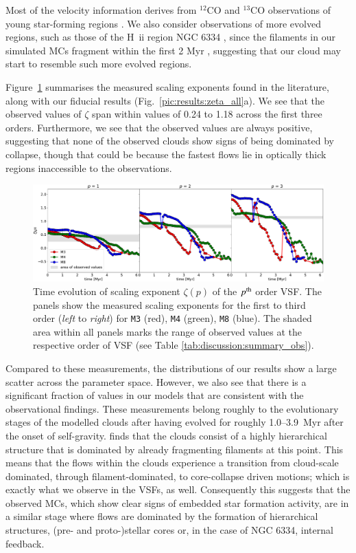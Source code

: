 \documentclass{aa}		%
\begin{document}
Most of the velocity information derives from $^{12}$CO and $^{13}$CO observations of young star-forming regions \citep[e.g. Perseus and Taurus][]{Padoan2003}.
We also consider observations of more evolved regions, such as those of the H~{\sc ii} region NGC 6334 \citep{Zernickel2015}, since the filaments in our simulated MCs fragment within the first 2 Myr , suggesting that our cloud may start to resemble such more evolved regions.

Figure~\ref{pic:discussion:comp_observation} summarises the measured scaling exponents found in the literature, along with our fiducial results (Fig.~\ref{pic:results:zeta_all}a).
We see that the observed values of $\zeta$ span within values of 0.24 to 1.18 across the first three orders. 
Furthermore, we see that the observed values are always positive, suggesting that none of the observed clouds show signs of being dominated by collapse, though that could be because the fastest flows lie in optically thick regions inaccessible to the observations.  

\begin{figure}
	\includegraphics[width=\textwidth]{compare_observations.pdf}
	\caption{
	Time evolution of scaling exponent $\zeta(p)$ of the $p^{\rm th}$ order VSF. 
	The panels show the measured scaling exponents for the first to third order (\textit{left} to \textit{right}) for \texttt{M3} (red), \texttt{M4} (green), \texttt{M8} (blue). 
	The shaded area within all panels marks the range of observed values at the respective order of VSF (see Table \ref{tab:discussion:summary_obs}).
	}
	\label{pic:discussion:comp_observation}
\end{figure}


Compared to these measurements, the distributions of our results show a large scatter across the parameter space. 
However, we also see that there is a significant fraction of values in our models that are consistent with the observational findings. 
These measurements belong roughly to the evolutionary stages of the modelled clouds after having evolved for roughly 1.0--3.9~Myr after the onset of self-gravity.
 finds that the clouds consist of a highly hierarchical structure that is dominated by already fragmenting filaments at this point.
This means that the flows within the clouds experience a transition from cloud-scale dominated, through filament-dominated, to core-collapse driven motions; which is exactly what we observe in the VSFs, as well.
Consequently this suggests that the observed MCs, which show clear signs of embedded star formation activity, are in a similar stage where flows are dominated by the formation of hierarchical structures, (pre- and proto-)stellar cores or, in the case of NGC 6334, internal feedback.
\end{document}
